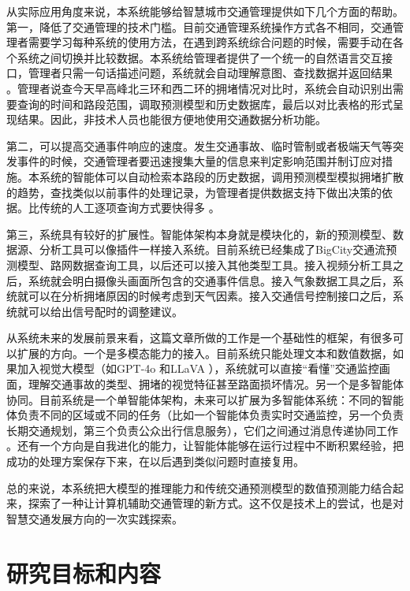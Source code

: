 从实际应用角度来说，本系统能够给智慧城市交通管理提供如下几个方面的帮助。第一，降低了交通管理的技术门槛。目前交通管理系统操作方式各不相同，交通管理者需要学习每种系统的使用方法，在遇到跨系统综合问题的时候，需要手动在各个系统之间切换并比较数据。本系统给管理者提供了一个统一的自然语言交互接口，管理者只需一句话描述问题，系统就会自动理解意图、查找数据并返回结果 。管理者说查今天早高峰北三环和西二环的拥堵情况对比时，系统会自动识别出需要查询的时间和路段范围，调取预测模型和历史数据库，最后以对比表格的形式呈现结果。因此，非技术人员也能很方便地使用交通数据分析功能。

第二，可以提高交通事件响应的速度。发生交通事故、临时管制或者极端天气等突发事件的时候，交通管理者要迅速搜集大量的信息来判定影响范围并制订应对措施。本系统的智能体可以自动检索本路段的历史数据，调用预测模型模拟拥堵扩散的趋势，查找类似以前事件的处理记录，为管理者提供数据支持下做出决策的依据。比传统的人工逐项查询方式要快得多 。

第三，系统具有较好的扩展性。智能体架构本身就是模块化的，新的预测模型、数据源、分析工具可以像插件一样接入系统。目前系统已经集成了BigCity交通流预测模型、路网数据查询工具，以后还可以接入其他类型工具。接入视频分析工具之后，系统就会明白摄像头画面所包含的交通事件信息。接入气象数据工具之后，系统就可以在分析拥堵原因的时候考虑到天气因素。接入交通信号控制接口之后，系统就可以给出信号配时的调整建议。

从系统未来的发展前景来看，这篇文章所做的工作是一个基础性的框架，有很多可以扩展的方向。一个是多模态能力的接入。目前系统只能处理文本和数值数据，如果加入视觉大模型（如GPT-4o 和LLaVA ），系统就可以直接“看懂”交通监控画面，理解交通事故的类型、拥堵的视觉特征甚至路面损坏情况。另一个是多智能体协同。目前系统是一个单智能体架构，未来可以扩展为多智能体系统：不同的智能体负责不同的区域或不同的任务（比如一个智能体负责实时交通监控，另一个负责长期交通规划，第三个负责公众出行信息服务），它们之间通过消息传递协同工作 。还有一个方向是自我进化的能力，让智能体能够在运行过程中不断积累经验，把成功的处理方案保存下来，在以后遇到类似问题时直接复用。

总的来说，本系统把大模型的推理能力和传统交通预测模型的数值预测能力结合起来，探索了一种让计算机辅助交通管理的新方式。这不仅是技术上的尝试，也是对智慧交通发展方向的一次实践探索。


\section{研究目标和内容}

